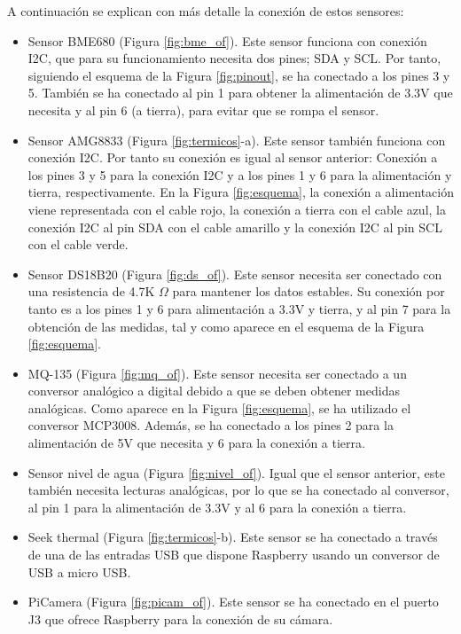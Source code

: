 A continuación se explican con más detalle la conexión de estos sensores:
\begin{itemize}
\item{Sensor BME680 (Figura \ref{fig:bme_of}).} Este sensor funciona con conexión I2C, que para su funcionamiento necesita dos pines; SDA y SCL. Por tanto, siguiendo el esquema de la Figura \ref{fig:pinout}, se ha conectado a los pines 3 y 5. También se ha conectado al pin 1 para obtener la alimentación de 3.3V que necesita y al pin 6 (a tierra), para evitar que se rompa el sensor.

\item{Sensor AMG8833 (Figura \ref{fig:termicos}-a).} Este sensor también funciona con conexión I2C. Por tanto su conexión es igual al sensor anterior: Conexión a los pines 3 y 5 para la conexión I2C y a los pines 1 y 6 para la alimentación y tierra, respectivamente. En la Figura \ref{fig:esquema}, la conexión a alimentación viene representada con el cable rojo, la conexión a tierra con el cable azul, la conexión I2C al pin SDA con el cable amarillo y la conexión I2C al pin SCL con el cable verde.

\item{Sensor DS18B20 (Figura \ref{fig:ds_of}).} Este sensor necesita ser conectado con una resistencia de 4.7K $\Omega$ para mantener los datos estables. Su conexión por tanto es a los pines 1 y 6 para alimentación a 3.3V y tierra, y al pin 7 para la obtención de las medidas, tal y como aparece en el esquema de la Figura \ref{fig:esquema}. 

\item{MQ-135 (Figura \ref{fig:mq_of}).} Este sensor necesita ser conectado a un conversor analógico a digital debido a que se deben obtener medidas analógicas. Como aparece en la Figura \ref{fig:esquema}, se ha utilizado el conversor MCP3008. Además, se ha conectado a los pines 2 para la alimentación de 5V que necesita y 6 para la conexión a tierra.

\item{Sensor nivel de agua (Figura \ref{fig:nivel_of}).} Igual que el sensor anterior, este también necesita lecturas analógicas, por lo que se ha conectado al conversor, al pin 1 para la alimentación de 3.3V y al 6 para la conexión a tierra.

\item{Seek thermal (Figura \ref{fig:termicos}-b).} Este sensor se ha conectado a través de una de las entradas USB que dispone Raspberry usando un conversor de USB a micro USB.

\item{PiCamera (Figura \ref{fig:picam_of}).} Este sensor se ha conectado en el puerto J3 que ofrece Raspberry para la conexión de su cámara. 
\end{itemize}

